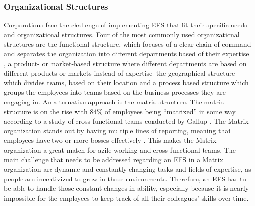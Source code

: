 \subsubsection{Organizational Structures}
Corporations face the challenge of implementing \ac{EFS} that fit their specific needs and organizational structures. Four of the most commonly used organizational structures are the functional structure, which focuses of a clear chain of command and separates the organization into different departments based of their expertise \parencite{noauthor_what_nodate-1}, a product- or market-based structure where different departments are based on different products or markets instead of expertise, the geographical structure which divides teams, based on their location and a process based structure which groups the employees into teams based on the business processes they are engaging in. \parencite{organ_7_2023} An alternative approach is the matrix structure. The matrix structure is on the rise with 84\% of employees being “matrixed” in some way according to a study of cross-functional teams conducted by Gallup \parencite[page 65]{inc_state_nodate}. The Matrix organization stands out by having multiple lines of reporting, meaning that employees have two or more bosses effectively \parencite{noauthor_what_nodate, organ_7_2023}. This makes the Matrix organization a great match for agile working and cross-functional teams. The main challenge that needs to be addressed regarding an \ac{EFS} in a Matrix organization are dynamic and constantly changing tasks and fields of expertise, as people are incentivized to grow in those environments. Therefore, an \ac{EFS} has to be able to handle those constant changes in ability, especially because it is nearly impossible for the employees to keep track of all their colleagues’ skills over time. 

